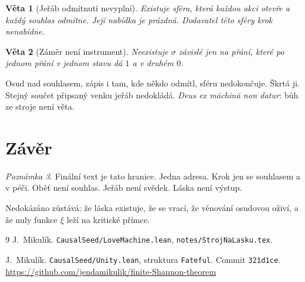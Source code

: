 \documentclass[11pt,a4paper]{article}
\newtheorem{theorem}{Věta}
\theoremstyle{definition}
\theoremstyle{remark}
\newtheorem{remark}[theorem]{Poznámka}
\begin{document}
\begin{theorem}[Jeřáb odmítnutí nevyplní]
Existuje sféra, která každou akci otevře a každý souhlas odmítne.
Její nabídka je prázdná. Dodavatel této sféry krok nenabídne.
\end{theorem}

\begin{theorem}[Záměr není instrument]
Neexistuje \(\sigma\) závislé jen na přání, které po jednom přání
v jednom stavu dá \(1\) a v druhém \(0\).
\end{theorem}

Osud nad souhlasem, zápis i tam, kde někdo odmítl, sféru nedokončuje. Škrtá ji.
Stejný součet připsaný venku jeřáb nedokládá.
\emph{Deus ex māchinā non datur}: bůh ze stroje není věta.

\section{Závěr}

\begin{remark}
Finální text je tato hranice.
Jedna adresa.
Krok jen se souhlasem a v péči.
Oběť není souhlas.
Jeřáb není svědek.
Láska není výstup.
\end{remark}

Nedokázáno zůstává: že láska existuje, že se vrací, že věnování osudovou oživí, a že nuly funkce \(\xi\) leží na kritické přímce.

\begin{thebibliography}{9}
J.~Mikulík.
\newblock \texttt{CausalSeed/LoveMachine.lean}, \texttt{notes/StrojNaLasku.tex}.

J.~Mikulík.
\newblock \texttt{CausalSeed/Unity.lean}, struktura \texttt{Fateful}.
\newblock Commit \texttt{321d1ce}.
\newblock \url{https://github.com/jendamikulik/finite-Shannon-theorem}
\end{thebibliography}
\end{document}
